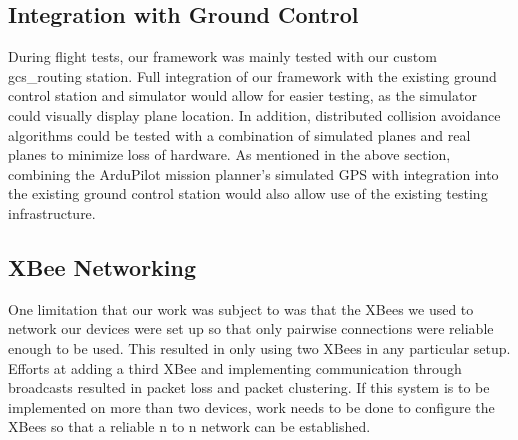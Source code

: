 \documentclass[conference]{IEEEtran}
\begin{document}
\subsection{Integration with Ground Control}
During flight tests, our framework was mainly tested with our custom gcs\_routing station. Full integration of our framework with the existing ground control station and simulator would allow for easier testing, as the simulator could visually display plane location. In addition, distributed collision avoidance algorithms could be tested with a combination of simulated planes and real planes to minimize loss of hardware. As mentioned in the above section, combining the ArduPilot mission planner's simulated GPS with integration into the existing ground control station would also allow use of the existing testing infrastructure.

\subsection{XBee Networking}

One limitation that our work was subject to was that the XBees we used to network our devices were set up so that only pairwise connections were reliable enough to be used.  This resulted in only using two XBees in any particular setup.  Efforts at adding a third XBee and implementing communication through broadcasts resulted in packet loss and packet clustering.  If this system is to be implemented on more than two devices, work needs to be done to configure the XBees so that a reliable n to n network can be established. 


%
%
\end{document}
